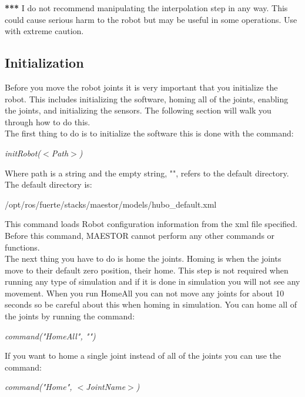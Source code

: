 \documentclass[12pt]{article}
\begin{document}
\textbf{***} I do not recommend manipulating the interpolation step in any way. This could cause serious harm to the robot but may be useful in some operations. Use with extreme caution. 

\subsection{Initialization}

Before you move the robot joints it is very important that you initialize the robot. This includes initializing the software, homing all of the joints, enabling the joints, and initializing the sensors. The following section will walk you through how to do this.\\

The first thing to do is to initialize the software this is done with the command:
	\begin{center}
		\textit{initRobot($<$Path$>$)}
	\end{center}

Where path is a string and the empty string, "", refers to the default directory. The default directory is:
 
\begin{center}
	/opt/ros/fuerte/stacks/maestor/models/hubo\_default.xml
\end{center}

This command loads Robot configuration information from the xml file specified. 
Before this command, MAESTOR cannot perform any other commands or functions.\\

The next thing you have to do is home the joints. Homing is when the joints move to their default zero position, their home. This step is not required when running any type of simulation and if it is done in simulation you will not see any movement. When you run HomeAll you can not move any joints for about 10 seconds so be careful about this when homing in simulation. You can home all of the joints by running the command:

	\begin{center}
		\textit{command("HomeAll", "")}
	\end{center}

If you want to home a single joint instead of all of the joints you can use the command:

	\begin{center}
		\textit{command("Home", $<$JointName$>$)}
	\end{center}
	
\end{document}
